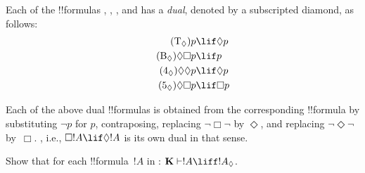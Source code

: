 \documentclass[../../../include/open-logic-section]{subfiles}
\begin{document}


\begin{defn}
  Each of the !!{formula}s , , , and
   has a \emph{dual}, denoted by a subscripted diamond, as
  follows:
  \begin{align}
    \tag{\Ax{T_\Diamond}} p & \lif \Diamond p\\
    \tag{\Ax{B_\Diamond}} \Diamond\Box p & \lif p\\
    \tag{\Ax{4_\Diamond}} \Diamond\Diamond p & \lif \Diamond p\\
    \tag{\Ax{5_\Diamond}} \Diamond\Box p & \lif \Box p
    \end{align}
\end{defn}

Each of the above dual !!{formula}s is obtained from the corresponding
!!{formula} by substituting $\lnot p$ for $p$, contraposing, replacing
$\lnot\Box\lnot$ by $\Diamond$, and replacing $\lnot\Diamond\lnot$
by~$\Box$. , i.e., $\Box!A \lif \Diamond!A$ is its own dual in
that sense.

\begin{prob}
  Show that for each !!{formula}~$!A$ in :
  $\Log{K} \Proves !A \liff !A_\Diamond$.
\end{prob}
\end{document}
